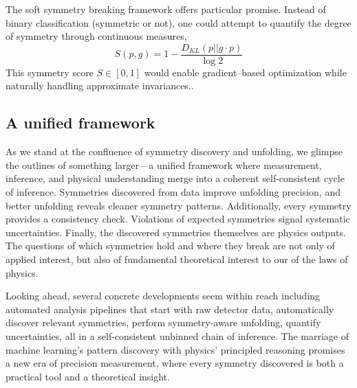         The soft symmetry breaking framework offers particular promise.
        Instead of binary classification (symmetric or not), one could attempt to quantify the degree of symmetry through continuous measures,
        \[
            S(p, g) = 1 - \frac{D_{KL}(p || g \cdot p)}{\log 2}
        \]
        This symmetry score \(S \in [0,1]\) would enable gradient--based optimization while naturally handling approximate invariances..
    
    \subsection{A unified framework}
        As we stand at the confluence of symmetry discovery and unfolding, we glimpse the outlines of something larger—a unified framework where measurement, inference, and physical understanding merge into a coherent self-consistent cycle of inference.
        Symmetries discovered from data improve unfolding precision, and better unfolding reveals cleaner symmetry patterns.
        Additionally, every symmetry provides a consistency check.
        Violations of expected symmetries signal systematic uncertainties.
        Finally, the discovered symmetries themselves are physics outputs.
        The questions of which symmetries hold and where they break are not only of applied interest, but also of fundamental theoretical interest to our of the laws of physics.
    
        Looking ahead, several concrete developments seem within reach including automated analysis pipelines that start with raw detector data, automatically discover relevant symmetries, perform symmetry-aware unfolding, quantify uncertainties, all in a self-consistent unbinned chain of inference.
        The marriage of machine learning's pattern discovery with physics' principled reasoning promises a new era of precision measurement, where every symmetry discovered is both a practical tool and a theoretical insight.